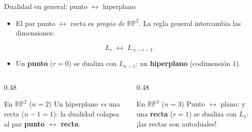 \documentclass[aspectratio=169]{beamer}
\newcommand{\RP}{\mathbb{RP}}
\begin{document}
\begin{frame}{Dualidad en general: punto $\leftrightarrow$ hiperplano}
  \begin{itemize}
    \item El par punto $\leftrightarrow$ recta es \emph{propio de} $\RP^2$.
          La regla general intercambia las dimensiones:
  \end{itemize}
  \[
    L_r \;\longleftrightarrow\; L_{\,n-r-1}.
  \]
  \begin{itemize}
    \item Un \textbf{punto} ($r=0$) se dualiza con $L_{n-1}$: un
          \textbf{hiperplano} (codimensión $1$).
  \end{itemize}
  \vspace{0.1cm}
  \begin{columns}[T]
    \begin{column}{0.48\textwidth}
      \begin{block}{En $\RP^2$ ($n=2$)}
        Un hiperplano \emph{es} una recta ($n-1=1$): la dualidad colapsa
        al par \textbf{punto $\leftrightarrow$ recta}.
      \end{block}
    \end{column}
    \begin{column}{0.48\textwidth}
      \begin{block}{En $\RP^3$ ($n=3$)}
        Punto $\leftrightarrow$ plano; y una \textbf{recta} ($r=1$) se
        dualiza con $L_{1}$: ¡las rectas son \alert{autoduales}!
      \end{block}
    \end{column}
  \end{columns}
\end{frame}
\end{document}
